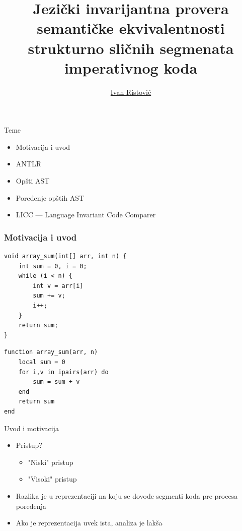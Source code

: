 \documentclass{beamer}
\title{Jezi\v{c}ki invarijantna provera semanti\v{c}ke ekvivalentnosti strukturno sli\v{c}nih segmenata imperativnog koda}
\author{\href{mailto:ivan_ristovic@math.rs}{Ivan Ristovi\'c}}
\date{}
\begin{document}
\begin{frame}
    \titlepage
\end{frame}

\begin{frame}{Teme}
    \begin{itemize}
        \item Motivacija i uvod
        \item ANTLR
        \item Op\v{s}ti AST
        \item Poređenje op\v{s}tih AST
        \item LICC --- Language Invariant Code Comparer
    \end{itemize}
\end{frame}

\begin{frame}[fragile]
\frametitle{Motivacija i uvod}
\begin{lstlisting}
void array_sum(int[] arr, int n) {
    int sum = 0, i = 0;
    while (i < n) {
        int v = arr[i]
        sum += v;
        i++;
    }
    return sum;
}
\end{lstlisting}
\begin{lstlisting}
function array_sum(arr, n)
    local sum = 0
    for i,v in ipairs(arr) do
        sum = sum + v
    end
    return sum
end
\end{lstlisting}
\end{frame}

\begin{frame}{Uvod i motivacija}
    \begin{itemize}
        \item Pristup?
        \begin{itemize}
            \item "Niski" pristup
            \item "Visoki" pristup 
        \end{itemize}
        \item Razlika je u reprezentaciji na koju se dovode segmenti koda pre procesa poređenja
        \item Ako je reprezentacija uvek ista, analiza je lakša
    \end{itemize}
\end{frame}
\end{document}
